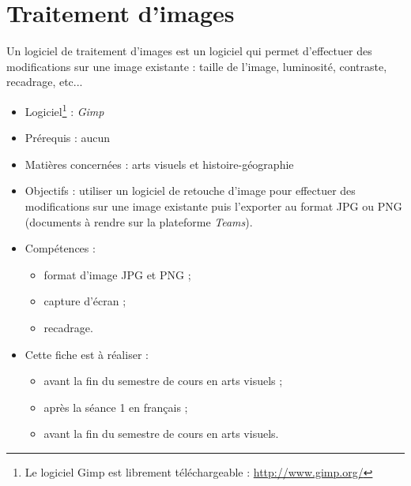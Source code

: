 \chapter{Traitement d'images}\label{ficheImage1}  

Un logiciel de traitement d'images est un logiciel qui permet d'effectuer des modifications sur une image existante : taille de l'image, luminosité, contraste, recadrage, etc...\\


\begin{itemize}
\item Logiciel\footnote{Le logiciel Gimp est librement téléchargeable : \url{http://www.gimp.org/}} : \emph{Gimp}
\item Prérequis : aucun
\item Matières concernées : arts visuels et histoire-géographie
\item Objectifs : utiliser un logiciel de retouche d'image pour effectuer des modifications sur une image existante puis l'exporter au format JPG ou PNG (documents à rendre sur la plateforme \emph{Teams}).
\item Compétences : 
        \begin{itemize}
        \item format d'image JPG et PNG ;
        \item capture d'écran ;
        \item recadrage.
        \end{itemize}
\item Cette fiche est à réaliser :
        \begin{itemize}
        \item avant la fin du semestre de cours en arts visuels ;
        \item après la séance 1 en français  ;
        \item avant la fin du semestre de cours en arts visuels. 
        \end{itemize}
\end{itemize}




